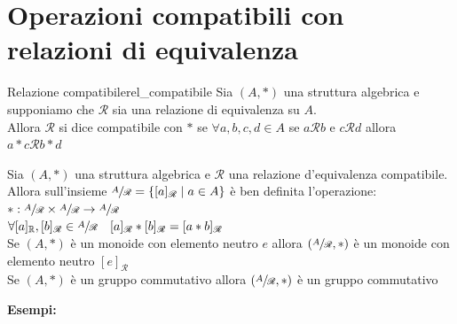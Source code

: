 \documentclass[12pt, letterpaper]{report}
\newcounter{theorem}
\newcounter{definition}
\newcommand{\nmu}{}
\begin{document}
		\section{Operazioni compatibili con relazioni di equivalenza}
		\begin{definition}{\nmu Relazione compatibile}{rel_compatibile}
			Sia $(A, *)$ una struttura algebrica e supponiamo che $\mathscr{R}$ sia una relazione di equivalenza su $A$. \\
			Allora $\mathscr{R}$ si dice compatibile con $*$ se $\forall a,b,c,d \in A$ se $a\mathscr{R}b$ e $c\mathscr{R}d$ allora $a*c\mathscr{R}b*d$
		\end{definition}
		\begin{theorem}{}{}
			Sia $(A, *)$ una struttura algebrica e $\mathscr{R}$ una relazione d'equivalenza compatibile. Allora sull'insieme $\sfrac{A}{\mathscr{R}} = \{[a]_\mathscr{R} \mid a \in A\}$ è ben definita l'operazione: \\
			$*:\sfrac{A}{\mathscr{R}}  \times \sfrac{A}{\mathscr{R}} \to \sfrac{A}{\mathscr{R}}$ \\
			$\forall [a]_\mathbb{R}, [b]_\mathscr{R} \in \sfrac{A}{\mathscr{R}} \quad [a]_\mathscr{R} * [b]_\mathscr{R} = [a * b]_\mathscr{R}$ \\
			Se $(A, *)$ è un monoide con elemento neutro $e$ allora $(\sfrac{A}{\mathscr{R}}, *)$ è un monoide con elemento neutro $[e]_\mathscr{R}$ \\
			Se $(A, *)$ è un gruppo commutativo allora $(\sfrac{A}{\mathscr{R}}, *)$ è un gruppo commutativo
		\end{theorem}
		\textbf{Esempi:}
\end{document}
